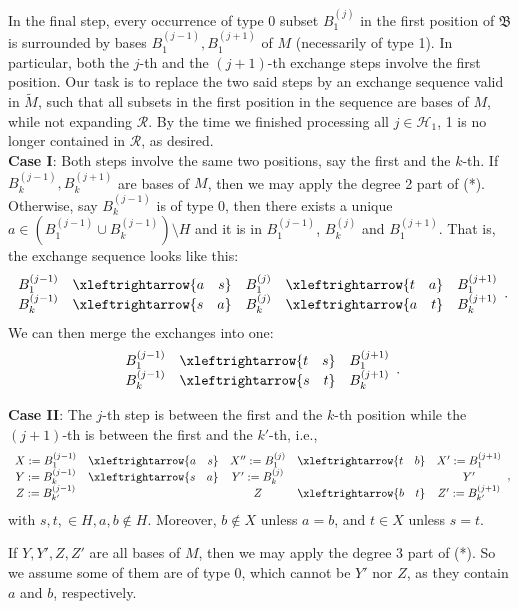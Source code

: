 \documentclass{amsart}
\newcommand{\swap}[2]{\xleftrightarrow{#1 \quad #2}}
\newcommand\Hcal{{\mathcal H}}
\newcommand\Rcal{{\mathcal R}}
\begin{document}
In the final step, every occurrence of type 0 subset $B_1^{(j)}$ in the first position of $\mathfrak{B}$ is surrounded by bases $B_1^{(j-1)}, B_1^{(j+1)}$ of $M$ (necessarily of type 1). In particular, both the $j$-th and the $(j+1)$-th exchange steps involve the first position. Our task is to replace the two said steps by an exchange sequence valid in $\widetilde{M}$, such that all subsets in the first position in the sequence are bases of $M$, while not expanding $\Rcal$. By the time we finished processing all $j\in\Hcal_1$, 1 is no longer contained in $\Rcal$, as desired.\\

{\bf Case I}: Both steps involve the same two positions, say the first and the $k$-th. If $B_k^{(j-1)}, B_k^{(j+1)}$ are bases of $M$, then we may apply the degree 2 part of (*). Otherwise, say $B_k^{(j-1)}$ is of type 0, then there exists a unique $a\in (B_1^{(j-1)}\cup B_k^{(j-1)})\setminus H$ and it is in $B_1^{(j-1)}$, $B_k^{(j)}$ and $B_1^{(j+1)}$. That is, the exchange sequence looks like this:
$$
\begin{array}{c c c c c}
   B_1^{(j-1)}   & \swap{a}{s} & B_1^{(j)} & \swap{t}{a} & B_1^{(j+1)}\\
   B_k^{(j-1)}   & \swap{s}{a} & B_k^{(j)} & \swap{a}{t} & B_k^{(j+1)}
\end{array}.
$$
We can then merge the exchanges into one:
$$
\begin{array}{c c c}
   B_1^{(j-1)}   & \swap{t}{s} & B_1^{(j+1)}\\
   B_k^{(j-1)}   & \swap{s}{t} & B_k^{(j+1)}
\end{array}.
$$

{\bf Case II}: The $j$-th step is between the first and the $k$-th position while the $(j+1)$-th is between the first and the $k'$-th, i.e.,
$$
    \begin{array}{c c c c c}
       X:=B_1^{(j-1)}   & \swap{a}{s} & X'':=B_1^{(j)}   & \swap{t}{b} & X':=B_1^{(j+1)} \\
       Y:=B_k^{(j-1)}   & \swap{s}{a} & Y':=B_k^{(j)} &             & Y' \\
       Z:=B_{k'}^{(j-1)}   &             & Z  & \swap{b}{t} & Z':=B_{k'}^{(j+1)}
    \end{array},
$$
with $s,t,\in H, a,b\not\in H$. Moreover, $b\not\in X$ unless $a=b$, and $t\in X$ unless $s=t$.

If $Y,Y',Z,Z'$ are all bases of $M$, then we may apply the degree 3 part of (*). So we assume some of them are of type 0, which cannot be $Y'$ nor $Z$, as they contain $a$ and $b$, respectively.\\
\end{document}
